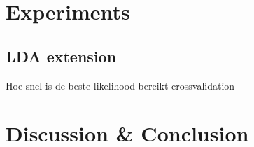 \documentclass[11pt,a4paper]{article}
\begin{document}
\section{Experiments}
\label{sec:Experiments}

\subsection{LDA extension}
Hoe snel is de beste likelihood bereikt
crossvalidation


\section{Discussion \& Conclusion}
\label{sec:DisCon}



\appendix

{}

\end{document}
